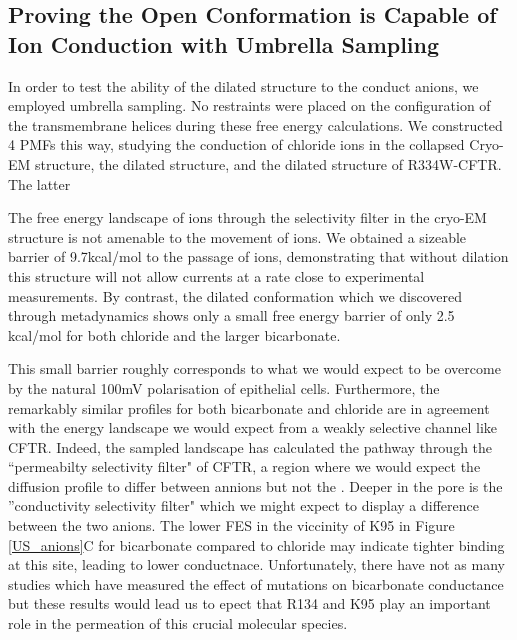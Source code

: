 \subsection{Proving the Open Conformation is Capable of Ion Conduction with Umbrella Sampling}

In order to test the ability of the dilated structure to the conduct anions, we employed umbrella sampling. No restraints were placed on the configuration of the transmembrane helices during these free energy calculations. We constructed 4 PMFs this way, studying the conduction of chloride ions in the collapsed Cryo-EM structure, the dilated structure, and the dilated structure of R334W-CFTR. The latter 

The free energy landscape of ions through the selectivity filter in the cryo-EM structure is not amenable to the movement of ions. We obtained a sizeable barrier of 9.7kcal/mol to the passage of ions, demonstrating that without dilation this structure will not allow currents at a rate close to experimental measurements. By contrast, the dilated conformation which we discovered through metadynamics shows only a small free energy barrier of only 2.5 kcal/mol for both chloride and the larger bicarbonate. 

This small barrier roughly corresponds to what we would expect to be overcome by the natural 100mV polarisation of epithelial cells. Furthermore, the remarkably similar profiles for both bicarbonate and chloride are in agreement with the energy landscape we would expect from a weakly selective channel like CFTR. Indeed, the sampled landscape has calculated the pathway through the ``permeabilty selectivity filter" of CFTR, a region where we would expect the diffusion profile to differ between annions but not the . Deeper in the pore is the ''conductivity selectivity filter" which we might expect to display a difference between the two anions. The lower FES in the viccinity of K95 in Figure \ref{US_anions}C for bicarbonate compared to chloride may indicate tighter binding at this site, leading to lower conductnace. Unfortunately, there have not as many studies which have measured the effect of mutations on bicarbonate conductance but these results would lead us to epect that R134 and K95 play an important role in the permeation of this crucial molecular species. 

